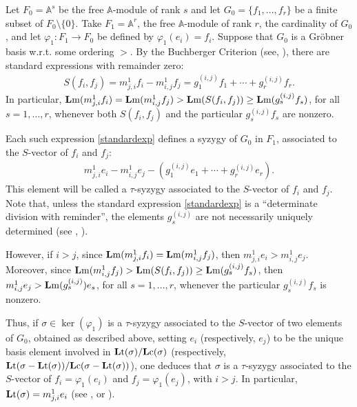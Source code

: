 \documentclass[ALCO]{cedram}
\newcommand{\mba}{\mbox{$\mathbb{A}$}}
\newcommand{\lc}{\mbox{${\bf L}{\rm c}$}}
\newcommand{\lm}{\mbox{${\bf L}{\rm m}$}}
\newcommand{\lt}{\mbox{${\bf L}{\rm t}$}}
\begin{document}
\begin{discussion}\label{disc}
Let $F_0=\mba^s$ be the free $\mba$-module of rank $s$ and let
$G_0=\{f_1,\ldots ,f_r\}$ be a finite subset of
$F_0\setminus\{0\}$. Take $F_1=\mba^r$, the free $\mba$-module of rank
$r$, the cardinality of $G_0$, and let $\varphi_1:F_1\rightarrow F_0$
be defined by $\varphi_1(e_i)=f_i$. Suppose that $G_0$ is a Gr\"obner
basis w.r.t. some ordering $>$. By the Buchberger Criterion (see,
\eg \cite[Theorem~15.8]{eisenbud}), there are standard
expressions with remainder zero:
\begin{eqnarray}\label{standardexp}
S(f_i,f_j)=m^1_{j,i}f_i-m^1_{i,j}f_j=g_1^{(i,j)}f_1+\cdots
+g_r^{(i,j)}f_r.
\end{eqnarray}
In particular, $\lm(m^1_{j,i}f_i)=\lm(m^1_{i,j}f_j)>\lm(S(f_i,f_j))
\geq \lm(g_s^{(i,j)}f_s)$, for all $s=1,\ldots, r$, whenever both
$S(f_i,f_j)$ and the particular $g_s^{(i,j)}f_s$ are nonzero.

Each such expression \eqref{standardexp} defines a syzygy of $G_0$ in
$F_1$, associated to the $S$-vector of $f_i$ and $f_j$:
\begin{eqnarray}\label{syzygy}
m^1_{j,i}e_i-m^1_{i,j}e_j-(g_1^{(i,j)}e_1+\cdots
+g_r^{(i,j)}e_r).
\end{eqnarray}
This element will be called a $\tau$-syzygy associated to the
$S$-vector of $f_i$ and $f_j$. Note that, unless the standard
expression \eqref{standardexp} is a ``determinate division with
reminder'', the elements $g_s^{(i,j)}$ are not necessarily uniquely
determined (see \cite[Theorem~1.3]{bs}, \cite[Theorem~2.2.12]{ds}).

However, if $i>j$, since $\lm(m^1_{j,i}f_i)=\lm(m^1_{i,j}f_j)$, then
$m^1_{j,i}e_i>m^1_{i,j}e_j$.  Moreover, since
$\lm(m^1_{i,j}f_j)>\lm(S(f_i,f_j))\geq \lm(g_s^{(i,j)}f_s)$, then
$m^1_{i,j}e_j>\lm(g_s^{(i,j)})e_s$, for all $s=1,\ldots ,r$, whenever
the particular $g_s^{(i,j)}f_s$ is nonzero.

Thus, if $\sigma\in\ker(\varphi_1)$ is a $\tau$-syzygy associated to
the $S$-vector of two elements of $G_0$, obtained as described above,
setting $e_i$ (respectively, $e_j$) to be the unique basis element
involved in $\lt(\sigma)/\lc(\sigma)$ (respectively, 
$\lt(\sigma-\lt(\sigma))/\lc(\sigma-\lt(\sigma))$), one deduces
that $\sigma$ is a $\tau$-syzygy associated to the $S$-vector of
$f_i=\varphi_1(e_i)$ and $f_j=\varphi_1(e_j)$, with $i>j$. In
particular, $\lt(\sigma)=m^1_{j,i}e_i$ (see \cite[p.6]{bs},
\cite[p.68]{ds} or \cite[Remark~3.6]{emss}).


\end{discussion}
\end{document}

